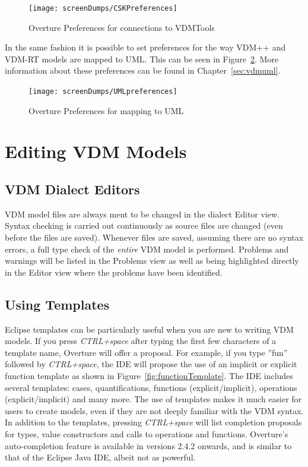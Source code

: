 \documentclass{overturerepchap}
\begin{document}
\begin{figure}[!hbt]
\begin{center}
  \texttt{[image: screenDumps/CSKPreferences]}
  \caption{Overture Preferences for connections to VDMTools}
  \label{fig:SCSKPreferences}
\end{center}
\end{figure}

In the same fashion it is possible to set preferences for the way VDM++ and VDM-RT models are mapped to UML. 
This can be seen in Figure~\ref{fig:UMLpreferences}. More information about 
these preferences can be found in Chapter~\ref{sec:vdmuml}.

\begin{figure}[!hbt]
\begin{center}
  \texttt{[image: screenDumps/UMLpreferences]}
  \caption{Overture Preferences for mapping to UML}
  \label{fig:UMLpreferences}
\end{center}
\end{figure}

\chapter{Editing VDM Models}\label{sec:editVDM}

\section{VDM Dialect Editors}

VDM model files are always ment to be changed in the dialect Editor view. Syntax checking
is carried out continuously as source files are
changed (even before the files are saved). Whenever files are saved, assuming
there are no syntax errors, a full type check of the \emph{entire} VDM model is
performed.
Problems and warnings will be listed in the Problems view as well as
being highlighted directly in the Editor view where the problems have been
identified.


\section{Using Templates}\label{sec:templates}

Eclipse templates can be particularly useful when you are new to
writing VDM models. If you press \textit{CTRL+space} after typing the
first few characters of a template name, Overture will offer a
proposal. For example, if you type ''fun'' followed by
\textit{CTRL+space}, the IDE will propose the use of an implicit or
explicit function template as shown in
Figure~\ref{fig:functionTemplate}. The IDE includes several templates:
cases, quantifications, functions (explicit/implicit), operations
(explicit/implicit) and many more. The use of templates makes it much
easier for users to create models, even if they are not deeply
familiar with the VDM syntax. In addition to the templates, pressing
\textit{CTRL+space} will list completion proposals for types, value
constructors and calls to operations and functions. Overture's
auto-completion feature is available in versions 2.4.2 onwards, and is
similar to that of the Eclipse Java IDE, albeit not as powerful.
\end{document}
